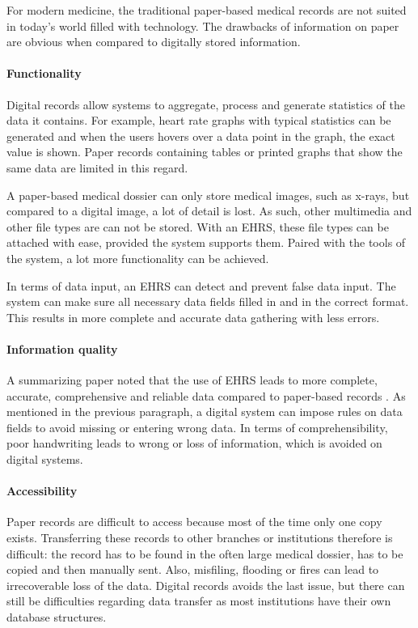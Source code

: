         For modern medicine, the traditional paper-based medical records are not suited in today's world filled with technology. The drawbacks of information on paper are obvious when compared to digitally stored information.

        \paragraph{Functionality} Digital records allow systems to aggregate, process and generate statistics of the data it contains. For example, heart rate graphs with typical statistics can be generated and when the users hovers over a data point in the graph, the exact value is shown. Paper records containing tables or printed graphs that show the same data are limited in this regard.

        A paper-based medical dossier can only store medical images, such as x-rays, but compared to a digital image, a lot of detail is lost. As such, other multimedia and other file types are can not be stored. With an EHRS, these file types can be attached with ease, provided the system supports them. Paired with the tools of the system, a lot more functionality can be achieved.

        In terms of data input, an EHRS can detect and prevent false data input. The system can make sure all necessary data fields filled in and in the correct format. This results in more complete and accurate data gathering with less errors.

        \paragraph{Information quality} A summarizing paper noted that the use of EHRS leads to more complete, accurate, comprehensive and reliable data compared to paper-based records \cite{ehrs_summary}. As mentioned in the previous paragraph, a digital system can impose rules on data fields to avoid missing or entering wrong data. In terms of comprehensibility, poor handwriting leads to wrong or loss of information, which is avoided on digital systems.

        \paragraph{Accessibility} Paper records are difficult to access because most of the time only one copy exists. Transferring these records to other branches or institutions therefore is difficult: the record has to be found in the often large medical dossier, has to be copied and then manually sent. Also, misfiling, flooding or fires can lead to irrecoverable loss of the data. Digital records avoids the last issue, but there can still be difficulties regarding data transfer as most institutions have their own database structures.


